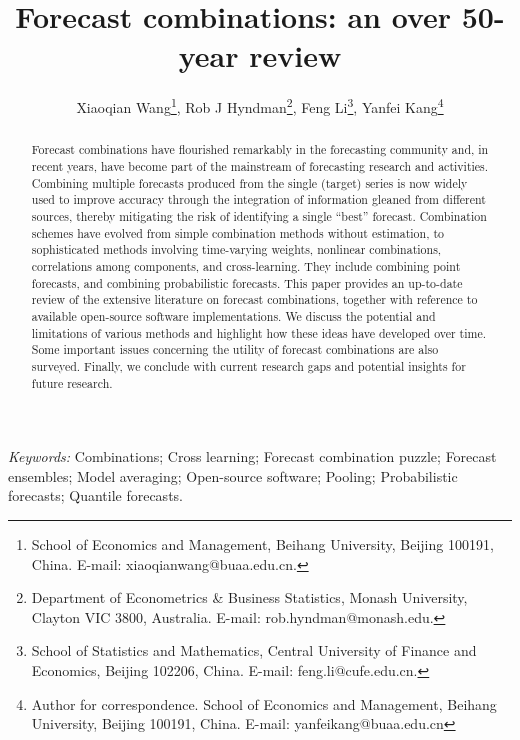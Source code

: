 \documentclass[a4paper,11pt]{article}
\begin{document}
\def\spacingset#1{\renewcommand{\baselinestretch}%
  {#1}\small\normalsize} \spacingset{1.25}

\title{\bf
  Forecast combinations: an over 50-year review
}

\author{Xiaoqian Wang\footnote{School of Economics and Management, Beihang University,
    Beijing 100191, China. E-mail: xiaoqianwang@buaa.edu.cn.},\quad
  Rob J Hyndman\footnote{Department of Econometrics \& Business Statistics, Monash University,
    Clayton VIC 3800, Australia. E-mail: rob.hyndman@monash.edu.},\quad
  Feng Li\footnote{School of Statistics and Mathematics, Central University of Finance and Economics,
    Beijing 102206, China. E-mail: feng.li@cufe.edu.cn.},\quad
  Yanfei Kang\footnote{Author for correspondence. School of Economics and Management, Beihang University,
    Beijing 100191, China. E-mail: yanfeikang@buaa.edu.cn}}

\maketitle

\bigskip
\begin{abstract}
  Forecast combinations have flourished remarkably in the forecasting community and, in recent years, have become part of the mainstream of forecasting research and activities. Combining multiple forecasts produced from the single (target) series is now widely used to improve accuracy through the integration of information gleaned from different sources, thereby mitigating the risk of identifying a single ``best'' forecast. Combination schemes have evolved from simple combination methods without estimation, to sophisticated methods involving time-varying weights, nonlinear combinations, correlations among components, and cross-learning. They include combining point forecasts, and combining probabilistic forecasts. This paper provides an up-to-date review of the extensive literature on forecast combinations, together with reference to available open-source software implementations. We discuss the potential and limitations of various methods and highlight how these ideas have developed over time. Some important issues concerning the utility of forecast combinations are also surveyed. Finally, we conclude with current research gaps and potential insights for future research.
\end{abstract}

\noindent%
\textit{Keywords:}
  Combinations;
  Cross learning;
  Forecast combination puzzle;
  Forecast ensembles;
  Model averaging;
  Open-source software;
  Pooling;
  Probabilistic forecasts;
  Quantile forecasts.
\vfill
\end{document}
